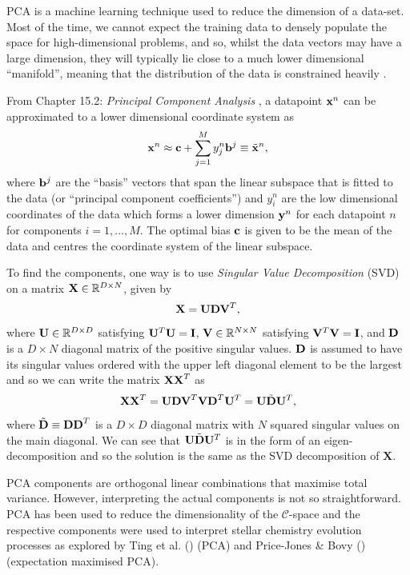 \documentclass[12pt, letterpaper]{article}
\begin{document}
    PCA is a machine learning technique used to reduce the dimension of a data-set. Most of the time, we cannot expect the training data to densely populate the space for high-dimensional problems, and so, whilst the data vectors may have a large dimension, they will typically lie close to a much lower dimensional ``manifold'', meaning that the distribution of the data is constrained heavily \citep{barber_2018}. 
    
    From Chapter 15.2: \emph{Principal Component Analysis} \citep{barber_2018}, a datapoint $\vb{x}^n$ can be approximated to a lower dimensional coordinate system as 
    $$\vb{x}^n \approx \vb{c}+\sum^{M}_{j=1}y^n_j\vb{b}^j \equiv \Tilde{\vb{x}}^n,$$
    where $\vb{b}^j$ are the ``basis'' vectors that span the linear subspace that is fitted to the data (or ``principal component coefficients'') and $y^n_i$ are the low dimensional coordinates of the data which forms a lower dimension $\vb{y}^n$ for each datapoint $n$ for components $i=1,\dots,M$. The optimal bias $\vb{c}$ is given to be the mean of the data and centres the coordinate system of the linear subspace.
    
    To find the components, one way is to use \emph{Singular Value Decomposition} (SVD) on a matrix $\vb{X}\in\mathbb{R}^{D\times N}$, given by
    $$\vb{X = UDV}^T,$$
    where $\vb{U}\in\mathbb{R}^{D\times D}$ satisfying $\vb{U}^T \vb{U} = \vb{I}$, $\vb{V}\in\mathbb{R}^{N\times N}$ satisfying $\vb{V}^T \vb{V} = \vb{I}$, and $\vb{D}$ is a $D\times N$ diagonal matrix of the positive singular values. $\vb{D}$ is assumed to have its singular values ordered with the upper left diagonal element to be the largest and so we can write the matrix $\vb{XX}^T$ as
    $$\vb{XX}^T = \vb{UDV}^T\vb{VD}^T\vb{U}^T = \vb{U}\Tilde{\vb{D}}\vb{U}^T,$$
    where $\Tilde{\vb{D}}\equiv\vb{DD}^T$ is a $D\times D$ diagonal matrix with $N$ squared singular values on the main diagonal. We can see that $\vb{U}\Tilde{\vb{D}}\vb{U}^T$ is in the form of an eigen-decomposition and so the solution is the same as the SVD decomposition of $\mathbf{X}$.
    
    PCA components are orthogonal linear combinations that maximise total variance. However, interpreting the actual components is not so straightforward. PCA has been used to reduce the dimensionality of the $\mathcal{C}$-space and the respective components were used to interpret stellar chemistry evolution processes as explored by Ting et al. (\citeyear{ting2012}) (PCA) and Price-Jones \& Bovy (\citeyear{bovy2017}) (expectation maximised PCA).
    
\end{document}
